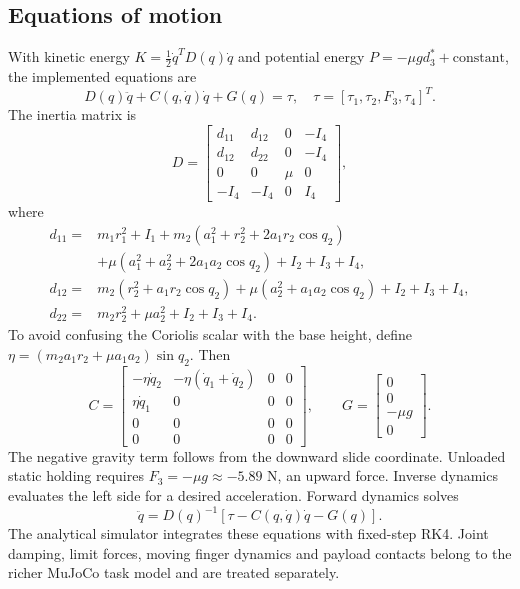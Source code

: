 \documentclass[11pt,a4paper]{article}
\begin{document}
\subsection{Equations of motion}
With kinetic energy $K=\tfrac12\dot q^TD(q)\dot q$ and potential energy
$P=-\mu g d_3^*+\text{constant}$, the implemented equations are
\begin{equation}
 D(q)\ddot q+C(q,\dot q)\dot q+G(q)=\tau,\quad
 \tau=[\tau_1,\tau_2,F_3,\tau_4]^T.
\end{equation}
The inertia matrix is
\begin{equation}
 D=\begin{bmatrix}
 d_{11}&d_{12}&0&-I_4\\d_{12}&d_{22}&0&-I_4\\
 0&0&\mu&0\\-I_4&-I_4&0&I_4
 \end{bmatrix},
\end{equation}
where
\begin{align}
 d_{11}={}&m_1r_1^2+I_1+m_2(a_1^2+r_2^2+2a_1r_2\cos q_2)\nonumber\\
 &+\mu(a_1^2+a_2^2+2a_1a_2\cos q_2)+I_2+I_3+I_4,\\
 d_{12}={}&m_2(r_2^2+a_1r_2\cos q_2)+\mu(a_2^2+a_1a_2\cos q_2)+I_2+I_3+I_4,\\
 d_{22}={}&m_2r_2^2+\mu a_2^2+I_2+I_3+I_4.
\end{align}
To avoid confusing the Coriolis scalar with the base height, define
$\eta=(m_2a_1r_2+\mu a_1a_2)\sin q_2$. Then
\begin{equation}
 C=\begin{bmatrix}
 -\eta\dot q_2&-\eta(\dot q_1+\dot q_2)&0&0\\
 \eta\dot q_1&0&0&0\\0&0&0&0\\0&0&0&0
 \end{bmatrix},\qquad
 G=\begin{bmatrix}0\\0\\-\mu g\\0\end{bmatrix}.
\end{equation}
The negative gravity term follows from the downward slide coordinate.
Unloaded static holding requires $F_3=-\mu g\approx-5.89$ N, an upward force.
Inverse dynamics evaluates the left side for a desired acceleration.
Forward dynamics solves
\begin{equation}
 \ddot q=D(q)^{-1}[\tau-C(q,\dot q)\dot q-G(q)].
\end{equation}
The analytical simulator integrates these equations with fixed-step RK4.
Joint damping, limit forces, moving finger dynamics and payload contacts
belong to the richer MuJoCo task model and are treated separately.
\end{document}
